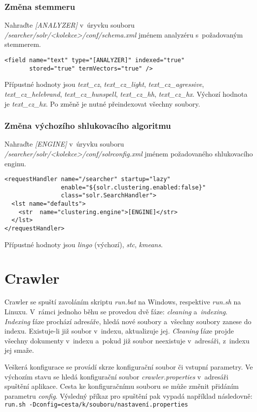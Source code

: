 \subsubsection{Změna stemmeru}
Nahraďte \emph{[ANALYZER]} v~úryvku souboru \emph{/searcher/solr/<kolekce>/conf/schema.xml} jménem analyzéru s~požadovaným stemmerem.
\begin{verbatim}
<field name="text" type="[ANALYZER]" indexed="true" 
       stored="true" termVectors="true" />
\end{verbatim}
Přípustné hodnoty jsou \emph{text\_cz}, \emph{text\_cz\_light}, \emph{text\_cz\_agressive}, \emph{text\_cz\_helebrand}, \emph{text\_cz\_hunspell}, \emph{text\_cz\_hh}, \emph{text\_cz\_hx}. Výchozí hodnota je \emph{text\_cz\_hx}. Po změně je nutné přeindexovat všechny soubory.

\subsubsection{Změna výchozího shlukovacího algoritmu}
Nahraďte \emph{[ENGINE]} v~úryvku souboru \emph{/searcher/solr/<kolekce>/conf/solrconfig.xml} jménem požadovaného shlukovacího enginu.
\begin{verbatim}
<requestHandler name="/searcher" startup="lazy"
                enable="${solr.clustering.enabled:false}"
                class="solr.SearchHandler">
  <lst name="defaults">
    <str  name="clustering.engine">[ENGINE]</str>
  </lst>
</requestHandler>
\end{verbatim}
Přípustné hodnoty jsou \emph{lingo} (výchozí), \emph{stc}, \emph{kmeans}.

\section{Crawler}
Crawler se spuští zavoláním skriptu \emph{run.bat} na Windows, respektive \emph{run.sh} na Linuxu. V~rámci jednoho běhu se provedou dvě fáze: \emph{cleaning} a~\emph{indexing}. \emph{Indexing} fáze prochází adresáře, hledá nové soubory a~všechny soubory zanese do indexu. Existuje-li již soubor v~indexu, aktualizuje jej. \emph{Cleaning} fáze projde všechny dokumenty v~indexu a~pokud již soubor neexistuje v~adresáři, z~indexu jej smaže. 

Veškerá konfigurace se provádí skrze konfigurační soubor či vstupní parametry. Ve výchozím stavu se hledá konfigurační soubor \emph{crawler.properties} v~adresáři spuštění aplikace. Cesta ke konfiguračnímu souboru se může změnit přidáním parametru \emph{config}. Výsledný příkaz pro spuštění pak vypadá například následovně: \\ \verb|run.sh -Dconfig=cesta/k/souboru/nastavení.properties| \\

